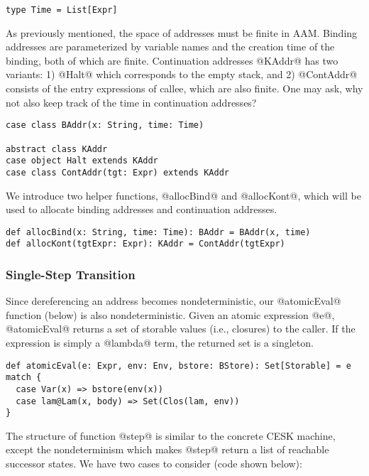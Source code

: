 \documentclass[acmsmall,review,anonymous]{acmart}\settopmatter{printfolios=true,printccs=false,printacmref=false}
\begin{document}
\begin{lstlisting}
type Time = List[Expr]
\end{lstlisting}

As previously mentioned, the space of addresses must be finite in AAM.
Binding addresses are parameterized by variable names and the creation time of the binding,
both of which are finite.
Continuation addresses @KAddr@ has two variants:
1) @Halt@ which corresponds to the empty stack, and
2) @ContAddr@ consists of the entry expressions of callee, which are also
finite.
One may ask, why not also keep track of the time in continuation addresses?

\begin{lstlisting}
case class BAddr(x: String, time: Time)

abstract class KAddr
case object Halt extends KAddr
case class ContAddr(tgt: Expr) extends KAddr
\end{lstlisting}

We introduce two helper functions, @allocBind@ and @allocKont@, which will be
used to allocate binding addresses and continuation addresses.

\begin{lstlisting}
def allocBind(x: String, time: Time): BAddr = BAddr(x, time)
def allocKont(tgtExpr: Expr): KAddr = ContAddr(tgtExpr)
\end{lstlisting}

\subsubsection{Single-Step Transition}

Since dereferencing an address becomes nondeterministic, our @atomicEval@
function (below) is also nondeterministic. Given an atomic expression @e@,
@atomicEval@ returns a set of storable values (i.e., closures) to the caller.
If the expression is simply a @lambda@ term, the returned set is a singleton.

\begin{lstlisting}
def atomicEval(e: Expr, env: Env, bstore: BStore): Set[Storable] = e match {
  case Var(x) => bstore(env(x))
  case lam@Lam(x, body) => Set(Clos(lam, env))
}
\end{lstlisting}

The structure of function @step@ is similar to the concrete CESK machine,
except the nondeterminism which makes @step@ return a list of reachable successor states.
We have two cases to consider (code shown below):
\end{document}
